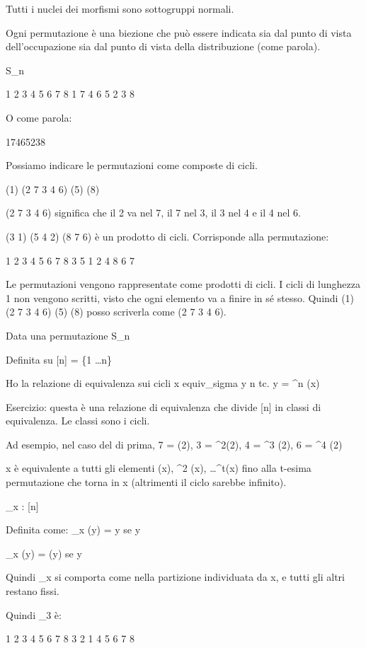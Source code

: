 Tutti i nuclei dei morfismi sono sottogruppi normali.

Ogni permutazione \`e una biezione che pu\`o essere indicata sia dal punto di vista dell'occupazione sia dal punto di vista della distribuzione (come parola).

\sigma \in S_n

1 2 3 4 5 6 7 8
1 7 4 6 5 2 3 8

O come parola:

17465238

Possiamo indicare le permutazioni come composte di cicli.

\sigma (1) (2 7 3 4 6) (5) (8)

(2 7 3 4 6) significa che il 2 va nel 7, il 7 nel 3, il 3 nel 4 e il 4 nel 6.

\mu (3 1) (5 4 2) (8 7 6) \`e un prodotto di cicli. Corrisponde alla permutazione:

1 2 3 4 5 6 7 8
3 5 1 2 4 8 6 7

Le permutazioni vengono rappresentate come prodotti di cicli. I cicli di lunghezza 1 non vengono scritti, visto che ogni elemento va a finire in s\'e stesso. Quindi \sigma (1) (2 7 3 4 6) (5) (8) posso scriverla come \sigma (2 7 3 4 6).

Data una permutazione
\sigma \in S_n 

Definita su
[n] = \{1 \dots n\}

Ho la relazione di equivalenza sui cicli
x equiv_sigma y \Leftrightarrow \exists n \in {} tc. y = \sigma^{n} (x)

Esercizio: questa \`e una relazione di equivalenza che divide [n] in classi di equivalenza. Le classi sono i cicli.

Ad esempio, nel caso del \sigma di prima, 7 = \sigma(2), 3 = \sigma^{2}(2), 4 = \sigma^{3} (2), 6 = \sigma^{4} (2)

x \`e equivalente a tutti gli elementi \sigma (x), \sigma^{2} (x), \dots \sigma^{t}(x) fino alla t-esima permutazione che torna in x (altrimenti il ciclo sarebbe infinito).

\mu_x : [n] \to [n]

Definita come:
\mu_x (y) = y se y \notin [x]

\mu_x (y) = \sigma(y) se y \in [x]

Quindi \mu_x si comporta come \mu nella partizione individuata da x, e tutti gli altri restano fissi.

Quindi \mu_3 \`e:

1 2 3 4 5 6 7 8
3 2 1 4 5 6 7 8

